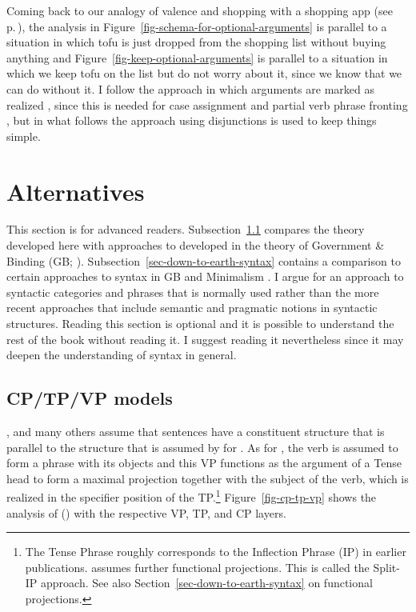 Coming back to our analogy of valence and shopping with a shopping app (see p.\,\pageref{page-shopping-analogy}), the
analysis in Figure~\ref{fig-schema-for-optional-arguments} is parallel to a situation in which tofu
is just dropped from the shopping list without buying anything and Figure~\ref{fig-keep-optional-arguments} is parallel to a
situation in which we keep tofu on the list but do not worry about it, since we know that we can do
without it. I follow the approach in which arguments are marked as realized \parencites[465]{MG2010a}[Chapter~16.4]{MuellerLehrbuch4}, since this is needed
for case assignment and partial verb phrase fronting \citep{Meurers99b}, but in what follows the
approach using disjunctions is used to keep things simple.






\section{Alternatives}

This section is for advanced readers. Subsection~\ref{sec-cp-tp-vp} compares the theory developed here with approaches to
 developed in the theory of Government \& Binding (GB; \citealt{Chomsky81a,Chomsky86b}). Subsection~\ref{sec-down-to-earth-syntax} contains a comparison to
certain approaches to syntax in GB and Minimalism \citep{Chomsky95a-u}. I argue for an approach to
syntactic categories and phrases that is normally used rather than the more recent approaches that
include semantic and pragmatic notions in syntactic structures. Reading this section is optional and it is
possible to understand the rest of the book without reading it. I suggest reading it nevertheless
since it may deepen the understanding of syntax in general.



\subsection{CP/TP/VP models}
\label{sec-cp-tp-vp}\label{sec-cp-tp-vp-scrambling}
\label{sec-discussion-scope}

\largerpage
\citet{Grewendorf88a,Grewendorf93}, \citet{Lohnstein2014a} and many others assume that 
sentences have a constituent structure that is parallel to the structure that is assumed by
\citet{Chomsky86b} for . As for , the verb is
assumed to form a phrase with its objects and this VP functions as the argument of a Tense head to
form a maximal projection together with the subject of the verb, which is realized in the specifier
position of the TP.\footnote{
The Tense Phrase roughly corresponds to the Inflection Phrase (IP) in earlier
publications. \citet[]{Pollock89a-u} assumes further functional projections. This is called the
Split-IP approach. See also Section~\ref{sec-down-to-earth-syntax} on functional projections.
} Figure~\ref{fig-cp-tp-vp} shows the analysis of () with the respective
VP, TP, and CP layers.

